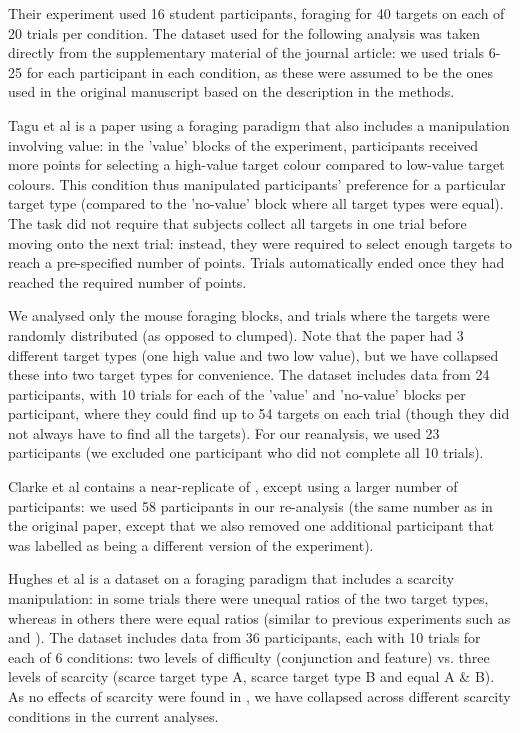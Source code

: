 \documentclass[man, floatsintext]{apa7}
\begin{document}
Their experiment used 16 student participants, foraging for 40 targets on each of 20 trials per condition. The dataset used for the following analysis was taken directly from the supplementary material of the journal article: we used trials 6-25 for each participant in each condition, as these were assumed to be the ones used in the original manuscript based on the description in the methods.

Tagu et al \cite{tagu2022selection} is a paper using a foraging paradigm that also includes a manipulation involving value: in the 'value' blocks of the experiment, participants received more points for selecting a high-value target colour compared to low-value target colours. This condition thus manipulated participants' preference for a particular target type (compared to the 'no-value' block where all target types were equal). The task did not require that subjects collect all targets in one trial before moving onto the next trial: instead, they were required to select enough targets to reach a pre-specified number of points. Trials automatically ended once they had reached the required number of points.


We analysed only the mouse foraging blocks, and trials where the targets were randomly distributed (as opposed to clumped). Note that the paper had 3 different target types (one high value and two low value), but we have collapsed these into two target types for convenience. The dataset includes data from 24 participants, with 10 trials for each of the 'value' and 'no-value' blocks per participant, where they could find up to 54 targets on each trial (though they did not always have to find all the targets). For our reanalysis, we used 23 participants (we excluded one participant who did not complete all 10 trials).

Clarke et al \cite{clarke2022qjep} contains a near-replicate of \cite{kristjansson2014}, except using a larger number of
participants: we used 58 participants in our re-analysis (the same number as in the original paper, except that we also removed one additional participant that was labelled as being a different version of the experiment).

Hughes et al \cite{hughes2024} is a dataset on a foraging paradigm that includes a scarcity manipulation: in some trials there were unequal ratios of the two target types, whereas in others there were equal ratios (similar to previous experiments such as \cite{clarke2022qjep} and \cite{kristjansson2014}). The dataset includes data from 36 participants, each with 10 trials for each of 6 conditions: two levels of difficulty (conjunction and feature) vs. three levels of scarcity (scarce target type A, scarce target type B and equal A \& B). As no effects of scarcity were found in \cite{hughes2024}, we have collapsed across different scarcity conditions in the current analyses.
\end{document}
